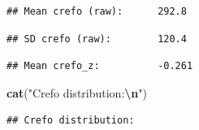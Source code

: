 \documentclass[
]{article}
\newenvironment{Shaded}{\begin{snugshade}}{\end{snugshade}}
\newcommand{\AttributeTok}[1]{\textcolor[rgb]{0.13,0.29,0.53}{#1}}
\newcommand{\DecValTok}[1]{\textcolor[rgb]{0.00,0.00,0.81}{#1}}
\newcommand{\FloatTok}[1]{\textcolor[rgb]{0.00,0.00,0.81}{#1}}
\newcommand{\FunctionTok}[1]{\textcolor[rgb]{0.13,0.29,0.53}{\textbf{#1}}}
\newcommand{\NormalTok}[1]{#1}
\newcommand{\SpecialCharTok}[1]{\textcolor[rgb]{0.81,0.36,0.00}{\textbf{#1}}}
\newcommand{\StringTok}[1]{\textcolor[rgb]{0.31,0.60,0.02}{#1}}
\begin{document}
\begin{verbatim}
## Mean crefo (raw):      292.8
\end{verbatim}

\begin{Shaded}
\end{Shaded}

\begin{verbatim}
## SD crefo (raw):        120.4
\end{verbatim}

\begin{Shaded}
\end{Shaded}

\begin{verbatim}
## Mean crefo_z:          -0.261
\end{verbatim}

\begin{Shaded}
\begin{Highlighting}[]
\FunctionTok{cat}\NormalTok{(}\StringTok{"Crefo distribution:}\SpecialCharTok{\textbackslash{}n}\StringTok{"}\NormalTok{)}
\end{Highlighting}
\end{Shaded}

\begin{verbatim}
## Crefo distribution:
\end{verbatim}

\begin{Shaded}
\end{Shaded}
\end{document}
